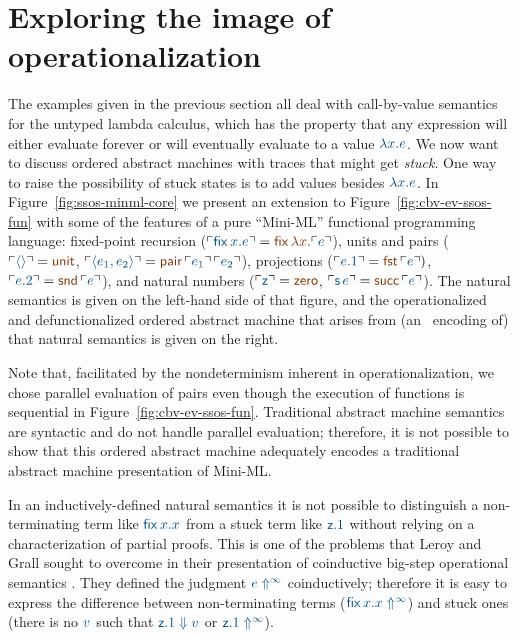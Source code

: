 \section{Exploring the image of operationalization}
\label{sec:absmachine-nondeterminism}

The examples given in the previous section all deal
with call-by-value semantics for the untyped lambda calculus, which
has the property that any expression will either evaluate forever or
will eventually evaluate to a value $\obj{\lambda x. e}$. We now want to
discuss ordered abstract machines with traces
that might get {\it stuck}. One way to raise the possibility of stuck
states is to add values besides $\obj{\lambda x.e}$. In
Figure~\ref{fig:ssos-minml-core} we present an extension to
Figure~\ref{fig:cbv-ev-ssos-fun} with some of the features of a pure
``Mini-ML'' functional programming language: fixed-point recursion
($\interp{{\sf fix}\,x.e} = \lf{{\sf fix}\,\lambda x.\interp{e}}$),
units and pairs ($\interp{\langle\rangle} = \lf{\sf unit}$,
$\interp{\langle e_1, e_2 \rangle} = \lf{{\sf
  pair}\,\interp{e_1}\,\interp{e_2}}$), projections ($\interp{e.1} =
\lf{{\sf fst}\,\interp{e}})$, $\interp{e.2} = \lf{{\sf snd}\,\interp{e}}$), and
natural numbers ($\interp{{\sf z}} = \lf{{\sf zero}}$, $\interp{{\sf s}\,e}
= \lf{{\sf succ}\,\interp{e}}$).  The natural semantics is given on the
left-hand side of that figure, and the operationalized and
defunctionalized ordered abstract machine that arises from (an
\sls~encoding of) that natural semantics is given on the right.


Note that, facilitated by the nondeterminism inherent in
operationalization, we chose parallel evaluation of pairs even though
the execution of functions is sequential in
Figure~\ref{fig:cbv-ev-ssos-fun}.  Traditional abstract machine
semantics are syntactic and do not handle parallel evaluation;
therefore, it is not possible to show that this ordered abstract
machine adequately encodes a traditional abstract machine presentation
of Mini-ML.

In an inductively-defined natural semantics it is not possible to
distinguish a non-terminating term like $\obj{{\sf fix}\,x.x}$ from a
stuck term like $\obj{{\sf z}.1}$ without relying on a
characterization of partial proofs.  This is one of the problems that
Leroy and Grall sought to overcome in their presentation of
coinductive big-step operational semantics
\cite{leroy09coinductive}. They defined the judgment $\obj{e
  \Uparrow^\infty}$ coinductively; therefore it is easy to express the
difference between non-terminating terms ($\obj{{\sf fix}\,x.x
  \Uparrow^\infty}$) and stuck ones (there is no $\obj{v}$ such that
$\obj{{\sf z}.1 \Downarrow v}$ or $\obj{{\sf z}.1 \Uparrow^\infty}$).

